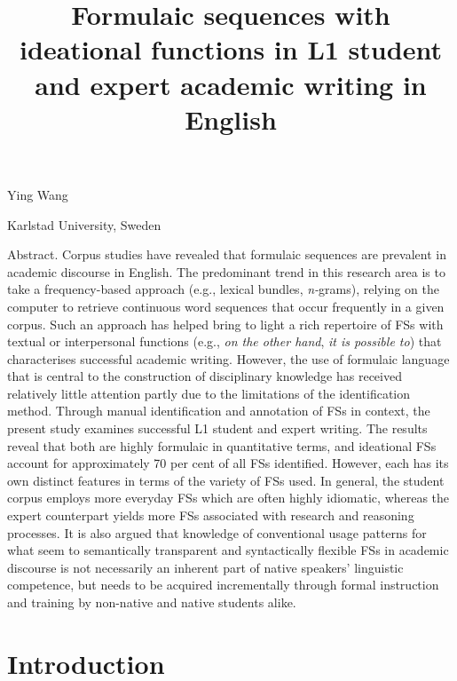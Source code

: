 
\title{Formulaic sequences with ideational functions in L1 student and expert academic writing in English}

Ying Wang 

Karlstad University, Sweden

Abstract. Corpus studies have revealed that formulaic sequences are prevalent in academic discourse in English. The predominant trend in this research area is to take a frequency-based approach (e.g., lexical bundles, \textit{n-}grams), relying on the computer to retrieve continuous word sequences that occur frequently in a given corpus. Such an approach has helped bring to light a rich repertoire of FSs with textual or interpersonal functions (e.g., \textit{on the other hand}, \textit{it is possible to}) that characterises successful academic writing. However, the use of formulaic language that is central to the construction of disciplinary knowledge has received relatively little attention partly due to the limitations of the identification method. Through manual identification and annotation of FSs in context, the present study examines successful L1 student and expert writing. The results reveal that both are highly formulaic in quantitative terms, and ideational FSs account for approximately 70 per cent of all FSs identified. However, each has its own distinct features in terms of the variety of FSs used. In general, the student corpus employs more everyday FSs which are often highly idiomatic, whereas the expert counterpart yields more FSs associated with research and reasoning processes. It is also argued that knowledge of conventional usage patterns for what seem to semantically transparent and syntactically flexible FSs in academic discourse is not necessarily an inherent part of native speakers’ linguistic competence, but needs to be acquired incrementally through formal instruction and training by non-native and native students alike.

\section{Introduction}

